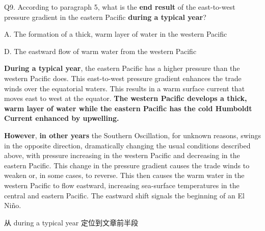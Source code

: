 \begin{blk}
    \begin{qst}
        Q9. According to paragraph 5, what is the \textbf{end result} of the east-to-west pressure gradient in the eastern Pacific \textbf{during a typical year}?
    \end{qst}

    \begin{chc}
        A. The formation of a thick, warm layer of water in the western Pacific

        D. The eastward flow of warm water from the western Pacific
    \end{chc}

    \begin{psgq}
        \textbf{During a typical year}, the eastern Pacific has a higher pressure than the western Pacific does. This east-to-west pressure gradient enhances the trade winds over the equatorial waters. This results in a warm surface current that moves east to west at the equator. \textbf{The western Pacific develops a thick, warm layer of water while the eastern Pacific has the cold Humboldt Current enhanced by upwelling.}

        \textbf{However}, \textbf{in other years} the Southern Oscillation, for unknown reasons, swings in the opposite direction, dramatically changing the usual conditions described above, with pressure increasing in the western Pacific and decreasing in the eastern Pacific. This change in the pressure gradient causes the trade winds to weaken or, in some cases, to reverse. This then causes the warm water in the western Pacific to flow eastward, increasing sea-surface temperatures in the central and eastern Pacific. The eastward shift signals the beginning of an El Niño.
    \end{psgq}

    \begin{nlz}
        从 during a typical year 定位到文章前半段
    \end{nlz}
\end{blk}
